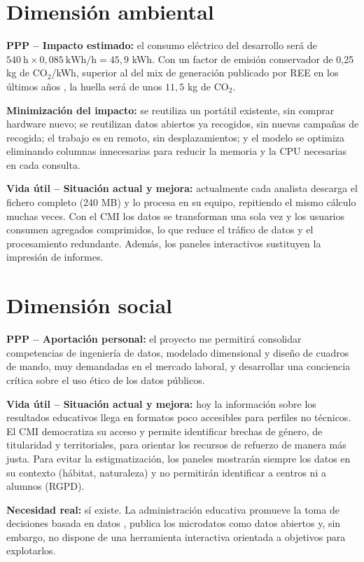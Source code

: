 \documentclass[12pt, a4paper, oneside]{report}
\begin{document}
\section{Dimensión ambiental}
\textbf{PPP -- Impacto estimado:} el consumo eléctrico del desarrollo será de $540\ \text{h} \times 0{,}085\ \text{kWh/h} = 45{,}9$ kWh. Con un factor de emisión conservador de 0,25 kg de CO$_2$/kWh, superior al del mix de generación publicado por REE en los últimos años \cite{ree_emisiones}, la huella será de unos $11{,}5$ kg de CO$_2$.

\textbf{Minimización del impacto:} se reutiliza un portátil existente, sin comprar hardware nuevo; se reutilizan datos abiertos ya recogidos, sin nuevas campañas de recogida; el trabajo es en remoto, sin desplazamientos; y el modelo se optimiza eliminando columnas innecesarias para reducir la memoria y la CPU necesarias en cada consulta.

\textbf{Vida útil -- Situación actual y mejora:} actualmente cada analista descarga el fichero completo (240 MB) y lo procesa en su equipo, repitiendo el mismo cálculo muchas veces. Con el CMI los datos se transforman una sola vez y los usuarios consumen agregados comprimidos, lo que reduce el tráfico de datos y el procesamiento redundante. Además, los paneles interactivos sustituyen la impresión de informes.

\section{Dimensión social}
\textbf{PPP -- Aportación personal:} el proyecto me permitirá consolidar competencias de ingeniería de datos, modelado dimensional y diseño de cuadros de mando, muy demandadas en el mercado laboral, y desarrollar una conciencia crítica sobre el uso ético de los datos públicos.

\textbf{Vida útil -- Situación actual y mejora:} hoy la información sobre los resultados educativos llega en formatos poco accesibles para perfiles no técnicos. El CMI democratiza su acceso y permite identificar brechas de género, de titularidad y territoriales, para orientar los recursos de refuerzo de manera más justa. Para evitar la estigmatización, los paneles mostrarán siempre los datos en su contexto (hábitat, naturaleza) y no permitirán identificar a centros ni a alumnos (RGPD).

\textbf{Necesidad real:} sí existe. La administración educativa promueve la toma de decisiones basada en datos \cite{mandinach2012data}, publica los microdatos como datos abiertos y, sin embargo, no dispone de una herramienta interactiva orientada a objetivos para explotarlos.



\end{document}
